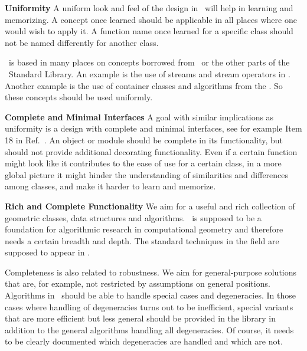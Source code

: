 {\bf Uniformity}
A uniform look and feel of the design in \cgal\ will help in learning
and memorizing. A concept once learned should be applicable in all
places where one would wish to apply it. 
A function name once learned for a specific
class should not be named differently for another class. 

\ccIndexMainItem{\stl}
\cgal\ is based in many places on concepts borrowed from \stl\ or the
other parts of the \CC\ Standard Library. An example is the use of
streams and stream operators in \cgal. Another example is the use of
container classes and algorithms from the \stl. So these concepts 
should be used uniformly.

{\bf Complete and Minimal Interfaces}
A goal with similar implications as uniformity is a design
with complete and minimal interfaces, see for example Item 18 
in Ref.~\cite{Meyers97}.
An object or module should be complete in its 
functionality, but should
not provide additional decorating functionality. Even if a certain
function might look like it contributes to the ease of use for a certain 
class, in a more global picture it might hinder the understanding of 
similarities and differences among classes, and make it harder to learn 
and memorize.

{\bf Rich and Complete Functionality}
We aim for a useful and rich collection of geometric classes, data
structures and algorithms. \cgal\ is supposed to be a foundation for
algorithmic research in computational geometry and therefore needs a
certain breadth and depth. The standard techniques in the field are
supposed to appear in \cgal. 

Completeness is also related to robustness.
We aim for general-purpose
solutions that are, for example, not restricted by assumptions on
general positions. Algorithms in \cgal\ should be able to handle
special cases and degeneracies. 
In those cases where handling of degeneracies turns out to be
inefficient, special variants that are more efficient but less general
should be provided in the library in addition to the general 
algorithms handling all degeneracies. Of course, it needs to be
clearly documented which degeneracies are handled and which are not.

